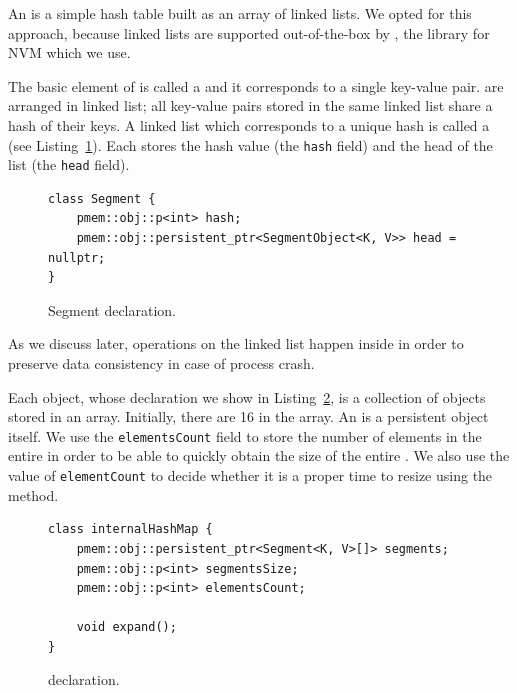    An \internalHashMap is a simple hash table built as an array of linked lists.
    We opted for this approach, because linked lists are supported out-of-the-box by \libpmemobj, the library for NVM which we use. 
    
    The basic element of \internalHashMap is called a \SegmentObject and it corresponds to a single key-value pair. 
    \SegmentObject are arranged in linked list; all key-value pairs stored in the same linked list share a hash of their keys. 
    A linked list which corresponds to a unique hash is called a \Segment (see Listing~\ref{Segment}). 
    Each \Segment stores the hash value (the \texttt{hash} field) and the head of the list (the \texttt{head} field).

\begin{figure}[ht]
\renewcommand{\figurename}{Listing}
\begin{lstlisting}
class Segment {
    pmem::obj::p<int> hash;
    pmem::obj::persistent_ptr<SegmentObject<K, V>> head = nullptr;
}
\end{lstlisting}
\caption{Segment declaration.}
\label{Segment}
\end{figure}

    As we discuss later, operations on the linked list happen inside \pmdktransactions in order to preserve data consistency in case of process crash.
    
    Each \internalHashMap object, whose declaration we show in Listing~\ref{internalHashMap}, is a collection of \Segment objects stored in an array. 
    Initially, there are 16 \Segments in the \segments array. 
    An \internalHashMap is a persistent object itself. 
    We use the \texttt{elementsCount} field to store the number of elements in the entire \internalHashMap in order to be able to quickly obtain the size of the entire \NvmHashMap. 
    We also use the value of \texttt{elementCount} to decide whether it is a proper time to resize \internalHashMap using the \expandMethod method.

\begin{figure}[ht]
\renewcommand{\figurename}{Listing}
\begin{lstlisting}
class internalHashMap {
    pmem::obj::persistent_ptr<Segment<K, V>[]> segments;
    pmem::obj::p<int> segmentsSize;
    pmem::obj::p<int> elementsCount;
    
    void expand();
}
\end{lstlisting}
\caption{\internalHashMap declaration.}
\label{internalHashMap}
\end{figure}

